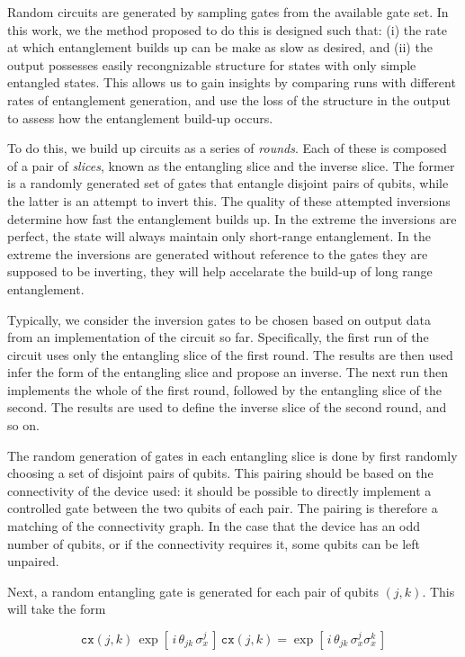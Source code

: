\documentclass[aps,prl,twocolumn,showpacs,preprintnumbers]{revtex4-1}
\newcommand{\be}{\begin{equation}}
\newcommand{\ee}{\end{equation}}
\begin{document}
Random circuits are generated by sampling gates from the available gate set. In this work, we the method proposed to do this is designed such that: (i) the rate at which entanglement builds up can be make as slow as desired, and (ii) the output possesses easily recongnizable structure for states with only simple entangled states. This allows us to gain insights by comparing runs with different rates of entanglement generation, and use the loss of the structure in the output to assess how the entanglement build-up occurs.

To do this, we build up circuits as a series of \textit{rounds}. Each of these is composed of a pair of \textit{slices}, known as the entangling slice and the inverse slice. The former is a randomly generated set of gates that entangle disjoint pairs of qubits, while the latter is an attempt to invert this. The quality of these attempted inversions determine how fast the entanglement builds up. In the extreme the inversions are perfect, the state will always maintain only short-range entanglement. In the extreme the inversions are generated without reference to the gates they are supposed to be inverting, they will help accelarate the build-up of long range entanglement.

Typically, we consider the inversion gates to be chosen based on output data from an implementation of the circuit so far. Specifically, the first run of the circuit uses only the entangling slice of the first round. The results are then used infer the form of the entangling slice and propose an inverse. The next run then implements the whole of the first round, followed by the entangling slice of the second. The results are used to define the inverse slice of the second round, and so on.

The random generation of gates in each entangling slice is done by first randomly choosing a set of disjoint pairs of qubits. This pairing should be based on the connectivity of the device used: it should be possible to directly implement a controlled gate between the two qubits of each pair. The pairing is therefore a matching of the connectivity graph. In the case that the device has an odd number of qubits, or if the connectivity requires it, some qubits can be left unpaired.

Next, a random entangling gate is generated for each pair of qubits $(j,k)$. This will take the form

\be
\mathtt{cx} (j,k) \, \exp [ \, i \, \theta_{jk} \, \sigma^j_x \, ] \, \mathtt{cx}(j,k) = \exp [ \, i \, \theta_{jk} \, \sigma^j_x \sigma^k_x \, ]
\ee
\end{document}
